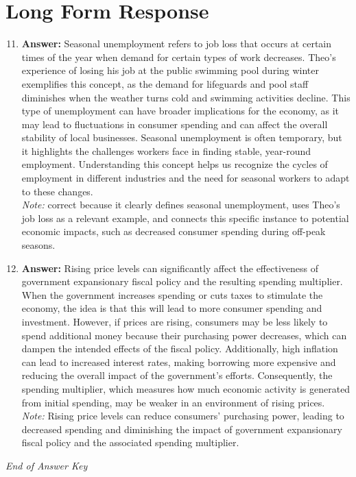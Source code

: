 \documentclass[12pt]{article}
\begin{document}
\section*{Long Form Response}
\begin{enumerate}[label=\arabic*.]
\setcounter{enumi}{10}
\item \textbf{Answer:} Seasonal unemployment refers to job loss that occurs at certain times of the year when demand for certain types of work decreases. Theo's experience of losing his job at the public swimming pool during winter exemplifies this concept, as the demand for lifeguards and pool staff diminishes when the weather turns cold and swimming activities decline. This type of unemployment can have broader implications for the economy, as it may lead to fluctuations in consumer spending and can affect the overall stability of local businesses. Seasonal unemployment is often temporary, but it highlights the challenges workers face in finding stable, year-round employment. Understanding this concept helps us recognize the cycles of employment in different industries and the need for seasonal workers to adapt to these changes.
\\ \textit{Note:} correct because it clearly defines seasonal unemployment, uses Theo's job loss as a relevant example, and connects this specific instance to potential economic impacts, such as decreased consumer spending during off-peak seasons.
\item \textbf{Answer:} Rising price levels can significantly affect the effectiveness of government expansionary fiscal policy and the resulting spending multiplier. When the government increases spending or cuts taxes to stimulate the economy, the idea is that this will lead to more consumer spending and investment. However, if prices are rising, consumers may be less likely to spend additional money because their purchasing power decreases, which can dampen the intended effects of the fiscal policy. Additionally, high inflation can lead to increased interest rates, making borrowing more expensive and reducing the overall impact of the government's efforts. Consequently, the spending multiplier, which measures how much economic activity is generated from initial spending, may be weaker in an environment of rising prices.
\\ \textit{Note:} Rising price levels can reduce consumers' purchasing power, leading to decreased spending and diminishing the impact of government expansionary fiscal policy and the associated spending multiplier.
\end{enumerate}

\vfill
\noindent\textit{End of Answer Key}
\end{document}
